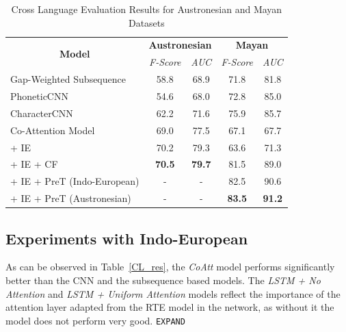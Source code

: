 \documentclass[11pt,letterpaper]{article}
\begin{document}
\begin{table}[t]
\centering
\begin{tabular}{lcccc}
\multicolumn{1}{c}{\multirow{2}{*}{\textbf{Model}}} & \multicolumn{2}{c}{\textbf{Austronesian}} & \multicolumn{2}{c}{\textbf{Mayan}} \\ \cline{2-5} 
\multicolumn{1}{c}{}                                & \textit{F-Score}      & \textit{AUC}      & \textit{F-Score}  & \textit{AUC}   \\ \hline
Gap-Weighted Subsequence                            & 58.8                  & 68.9              & 71.8              & 81.8           \\
PhoneticCNN                                         & 54.6                  & 68.0              & 72.8              & 85.0           \\
CharacterCNN                                        & 62.2                  & 71.6              & 75.9              & 85.7           \\ \hline
Co-Attention Model                                  & 69.0                  & 77.5              & 67.1              & 67.7           \\
\quad + IE                                          & 70.2                  & 79.3              & 63.6              & 71.3           \\
\quad + IE + CF                                     & \textbf{70.5}         & \textbf{79.7}     & 81.5              & 89.0           \\
\quad + IE + PreT (Indo-European)                   & -                     & -                 & 82.5              & 90.6           \\
\quad + IE + PreT (Austronesian)                    & -                     & -                 & \textbf{83.5}     & \textbf{91.2} 
\end{tabular}
\caption{Cross Language Evaluation Results for Austronesian and Mayan Datasets }
\label{CL_res_2}
\end{table}
\subsection{Experiments with Indo-European}

As can be observed in Table~\ref{CL_res}, the \textit{CoAtt} model performs significantly better than the CNN and the subsequence based models. The \textit{LSTM + No Attention} and \textit{LSTM + Uniform Attention} models reflect the importance of the attention layer adapted from the RTE model in the network, as without it the model does not perform very good. \texttt{EXPAND}
\end{document}
